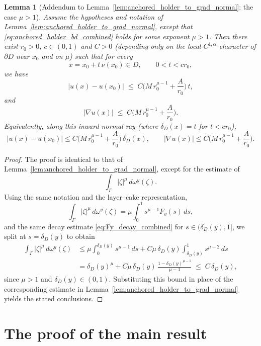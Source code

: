 \documentclass{amsart}
\newtheorem{lemma}[theorem]{Lemma}
\begin{document}
\begin{lemma}[Addendum to Lemma~\ref{lem:anchored_holder_to_grad_normal}: the case $\mu>1$]
\label{lema2}
Assume the hypotheses and notation of Lemma~\ref{lem:anchored_holder_to_grad_normal}, except that
\eqref{eq:anchored_holder_bd_combined} holds for some exponent $\mu>1$.
Then there exist $r_0>0$, $c\in(0,1)$ and $C>0$ (depending only on the local $C^{1,\alpha}$ character
of $\partial D$ near $x_0$ and on $\mu$) such that for every
\[
x=x_0+t\,\nu(x_0)\in D,\qquad 0<t<cr_0,
\]
we have
\begin{equation}\label{eq:holder_mu_gt_1}
|u(x)-u(x_0)|
\;\le\; C\Big(M\,r_0^{\mu-1}+\frac{A}{r_0}\Big)\,t,
\end{equation}
and
\begin{equation}\label{eq:grad_mu_gt_1}
|\nabla u(x)|
\;\le\; C\Big(M\,r_0^{\mu-1}+\frac{A}{r_0}\Big).
\end{equation}
Equivalently, along this inward normal ray (where $\delta_D(x)=t$ for $t<cr_0$),
\[
|u(x)-u(x_0)|
\le C\Big(M\,r_0^{\mu-1}+\frac{A}{r_0}\Big)\,\delta_D(x),
\qquad
|\nabla u(x)|
\le C\Big(M\,r_0^{\mu-1}+\frac{A}{r_0}\Big).
\]
\end{lemma}
\begin{proof}[Proof]
The proof is identical to that of Lemma~\ref{lem:anchored_holder_to_grad_normal}, except for the estimate of
\[
\int_{\Gamma}|\zeta|^\mu\,d\omega^y(\zeta).
\]
Using the same notation and the layer--cake representation,
\[
\int_{\Gamma}|\zeta|^\mu\,d\omega^y(\zeta)=\mu\int_0^1 s^{\mu-1}F_y(s)\,ds,
\]
and the same decay estimate \eqref{eq:Fy_decay_combined} for $s\in(\delta_D(y),1]$,
we split at $s=\delta_D(y)$ to obtain
\begin{align*}
\int_{\Gamma}|\zeta|^\mu\,d\omega^y(\zeta)
&\le \mu\int_0^{\delta_D(y)} s^{\mu-1}\,ds
   + C\mu\,\delta_D(y)\int_{\delta_D(y)}^{1} s^{\mu-2}\,ds \\
&= \delta_D(y)^\mu
   + C\mu\,\delta_D(y)\,\frac{1-\delta_D(y)^{\mu-1}}{\mu-1}
\;\le\; C\,\delta_D(y),
\end{align*}
since $\mu>1$ and $\delta_D(y)\in(0,1)$. Substituting this bound in place of the corresponding estimate
in Lemma~\ref{lem:anchored_holder_to_grad_normal} yields the stated conclusions.
\end{proof}


\section{The proof of the main result}\label{section4}
\end{document}
